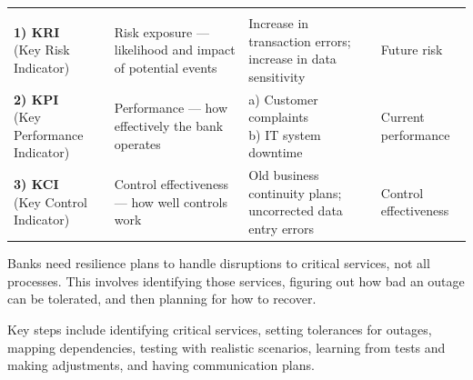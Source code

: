 
\noindent\begin{minipage}{\textwidth}
\renewcommand{\arraystretch}{1.35}
\begin{tabularx}{\textwidth}{@{}L{0.22\textwidth}L{0.25\textwidth}YL{0.22\textwidth}@{}}
  &  &  & \\
{\tabfont \textbf{1) KRI} \newline (Key Risk Indicator)} &
{\tabfont Risk exposure --- likelihood and impact of potential events} &
{\tabfont Increase in transaction errors; increase in data sensitivity} &
{\tabfont Future risk}\\
{\tabfont \textbf{2) KPI} \newline (Key Performance Indicator)} &
{\tabfont Performance --- how effectively the bank operates} &
{\tabfont a) Customer complaints \newline b) IT system downtime} &
{\tabfont Current performance}\\
{\tabfont \textbf{3) KCI} \newline (Key Control Indicator)} &
{\tabfont Control effectiveness --- how well controls work} &
{\tabfont Old business continuity plans; uncorrected data entry errors} &
{\tabfont Control effectiveness}\\
\end{tabularx}
\end{minipage}


Banks need resilience plans to handle disruptions to critical services, not all
processes. This involves identifying those services, figuring out how bad an
outage can be tolerated, and then planning for how to recover.

\begin{orkeybox}
Key steps include identifying critical services, setting tolerances for outages,
mapping dependencies, testing with realistic scenarios, learning from tests and
making adjustments, and having communication plans.
\end{orkeybox}
